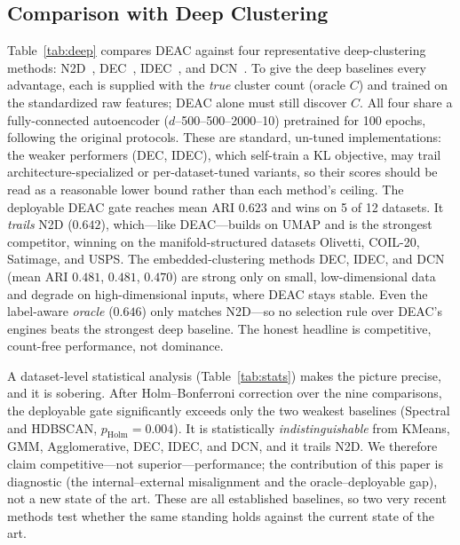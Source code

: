 \documentclass[journal]{IEEEtran}
\begin{document}
\subsection{Comparison with Deep Clustering}

Table~\ref{tab:deep} compares DEAC against four representative deep-clustering
methods: N2D~\cite{mcconville2021n2d}, DEC~\cite{xie2016unsupervised},
IDEC~\cite{guo2017improved}, and DCN~\cite{yang2017towards}. To give the
deep baselines every advantage, each is supplied with the \emph{true} cluster
count (oracle $C$) and trained on the standardized raw features; DEAC alone
must still discover $C$. All four share a fully-connected autoencoder
($d$--500--500--2000--10) pretrained for 100 epochs, following the original
protocols. These are standard, un-tuned implementations: the weaker performers
(DEC, IDEC), which self-train a KL objective, may trail architecture-specialized
or per-dataset-tuned variants, so their scores should be read as a reasonable
lower bound rather than each method's ceiling. The deployable DEAC gate reaches
mean ARI $0.623$ and wins on 5 of 12 datasets. It \emph{trails} N2D ($0.642$),
which---like DEAC---builds on UMAP and is the strongest competitor, winning on
the manifold-structured datasets Olivetti, COIL-20, Satimage, and USPS. The
embedded-clustering methods DEC, IDEC, and DCN (mean ARI $0.481$, $0.481$,
$0.470$) are strong only on small, low-dimensional data and degrade on
high-dimensional inputs, where DEAC stays stable. Even the label-aware
\emph{oracle} ($0.646$) only matches N2D---so no selection rule over DEAC's
engines beats the strongest deep baseline. The honest headline is competitive,
count-free performance, not dominance.



A dataset-level statistical analysis (Table~\ref{tab:stats}) makes the picture
precise, and it is sobering. After Holm--Bonferroni correction over the nine
comparisons, the deployable gate significantly exceeds only the two weakest
baselines (Spectral and HDBSCAN, $p_{\text{Holm}}{=}0.004$). It is statistically
\emph{indistinguishable} from KMeans, GMM, Agglomerative, DEC, IDEC, and DCN,
and it trails N2D. We therefore claim competitive---not superior---performance;
the contribution of this paper is diagnostic (the internal--external
misalignment and the oracle--deployable gap), not a new state of the art. These
are all established baselines, so two very recent methods test whether the same
standing holds against the current state of the art.
\end{document}
